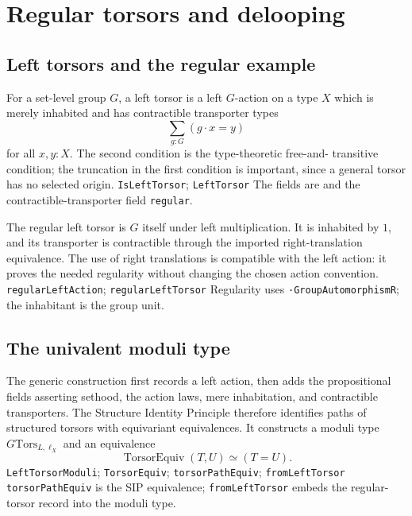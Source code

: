 \section{Regular torsors and delooping}
\label{sec:torsors}

\subsection{Left torsors and the regular example}
For a set-level group $G$, a left torsor is a left $G$-action on a type $X$
which is merely inhabited and has contractible transporter types
\begin{equation}
  \sum_{g:G}(g\cdot x=y)
\end{equation}
for all $x,y:X$.  The second condition is the type-theoretic free-and-
transitive condition; the truncation in the first condition is important,
since a general torsor has no selected origin.
{\texttt{IsLeftTorsor}; \texttt{LeftTorsor}}
{The fields are  and the contractible-transporter field \texttt{regular}.}

The regular left torsor is $G$ itself under left multiplication.  It is
inhabited by $1$, and its transporter is contractible through the imported
right-translation equivalence.  The use of right translations is compatible
with the left action: it proves the needed regularity without changing the
chosen action convention.
{\texttt{regularLeftAction}; \texttt{regularLeftTorsor}}
{Regularity uses \texttt{·GroupAutomorphismR}; the inhabitant is the group unit.}

\subsection{The univalent moduli type}
The generic construction first records a left action, then adds the
propositional fields asserting sethood, the action laws, mere inhabitation,
and contractible transporters.  The Structure Identity Principle therefore
identifies paths of structured torsors with equivariant equivalences.  It
constructs a moduli type $G\mathrm{Tors}_{L,\ell_X}$ and an equivalence
\begin{equation}
 \operatorname{TorsorEquiv}(T,U)\simeq(T=U).
 \label{eq:sip-torsors}
\end{equation}
{\texttt{LeftTorsorModuli}; \texttt{TorsorEquiv}; \texttt{torsorPathEquiv}; \texttt{fromLeftTorsor}}
{\texttt{torsorPathEquiv} is the SIP equivalence; \texttt{fromLeftTorsor} embeds the regular-torsor record into the moduli type.}


